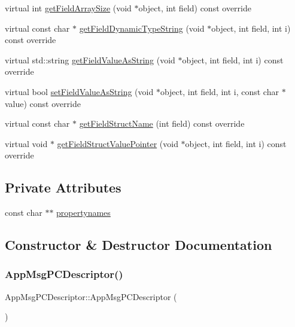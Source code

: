 \begin{DoxyCompactItemize}
virtual int \hyperlink{class_app_msg_p_c_descriptor_abd0b0ccd2b54ad45825704c566922f67}{get\+Field\+Array\+Size} (void $\ast$object, int field) const override
\item 
virtual const char $\ast$ \hyperlink{class_app_msg_p_c_descriptor_a17016d018e18d544b226ecd3119de5b2}{get\+Field\+Dynamic\+Type\+String} (void $\ast$object, int field, int i) const override
\item 
virtual std\+::string \hyperlink{class_app_msg_p_c_descriptor_ac5f4467bbe2dae35c300f7288bfc4003}{get\+Field\+Value\+As\+String} (void $\ast$object, int field, int i) const override
\item 
virtual bool \hyperlink{class_app_msg_p_c_descriptor_a8eecfb063c75f3c72ceb3646680b9261}{set\+Field\+Value\+As\+String} (void $\ast$object, int field, int i, const char $\ast$value) const override
\item 
virtual const char $\ast$ \hyperlink{class_app_msg_p_c_descriptor_a10b8057293b17adac40060a533966cf8}{get\+Field\+Struct\+Name} (int field) const override
\item 
virtual void $\ast$ \hyperlink{class_app_msg_p_c_descriptor_aaeff42267f2ab084ef76f8bf9eb0eedd}{get\+Field\+Struct\+Value\+Pointer} (void $\ast$object, int field, int i) const override
\end{DoxyCompactItemize}
\subsection*{Private Attributes}
\begin{DoxyCompactItemize}
\item 
const char $\ast$$\ast$ \hyperlink{class_app_msg_p_c_descriptor_aaeca386eddf80dd71ff4cdd3bb1353a7}{propertynames}
\end{DoxyCompactItemize}


\subsection{Constructor \& Destructor Documentation}
\mbox{\label{class_app_msg_p_c_descriptor_a3a331f63d98d56b7433d83ad6afd2fa1}} 
\subsubsection{\texorpdfstring{App\+Msg\+P\+C\+Descriptor()}{AppMsgPCDescriptor()}}
{\footnotesize\ttfamily App\+Msg\+P\+C\+Descriptor\+::\+App\+Msg\+P\+C\+Descriptor (\begin{DoxyParamCaption}{ }\end{DoxyParamCaption})}

